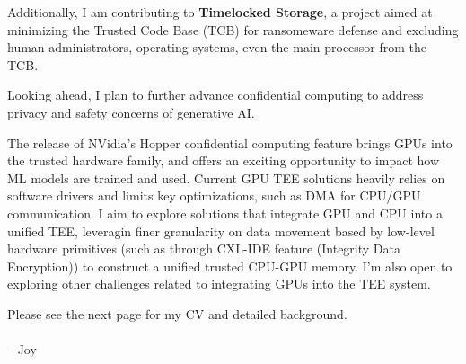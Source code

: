 Additionally, I am contributing to \textbf{Timelocked Storage}, a project aimed at minimizing the Trusted Code Base (TCB) for ransomeware defense and excluding human administrators, operating systems, even the main processor from the TCB. \par

\vspace{3ex}
Looking ahead, I plan to further advance confidential computing to address privacy and safety concerns of generative AI.  \par
The release of NVidia's Hopper confidential computing feature brings GPUs into the trusted hardware family, and offers an exciting opportunity to impact how ML models are trained and used. Current GPU TEE solutions heavily relies on software drivers and limits key optimizations, such as DMA for CPU/GPU communication. I aim to explore solutions that integrate GPU and CPU into a unified TEE, leveragin finer granularity on data movement based by low-level hardware primitives (such as through CXL-IDE feature (Integrity Data Encryption)) to construct a unified trusted CPU-GPU memory. I'm also open to exploring other challenges related to integrating GPUs into the TEE system. \\

\vspace{3ex}

Please see the next page for my CV and detailed background. \\
\paragraph*{}
\begin{flushright} -- Joy\end{flushright}
